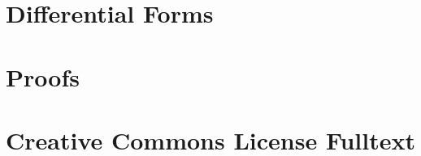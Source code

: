 \documentclass[letter, 11pt, onesided]{memoir}
\renewcommand{\chapnumfont}{\normalfont\huge\sffamily\bfseries}
\renewcommand{\printchaptername}{\chapnumfont Chapter}
\numberwithin{dummy}{section}
\theoremstyle{orangenumbox}
\theoremstyle{ocrenumbox}
\begin{document}
\chapter{Differential Forms}
	
	\clearpage

\appendix
\renewcommand{\printchaptername}{\chapnumfont Appendix}
\chapter{Proofs}
	\label{APPENDIX-proofstyle}
	

\chapter{Creative Commons License Fulltext}
	\label{APPENDIX-license}
	

\backmatter


% 
% 
\end{document}

